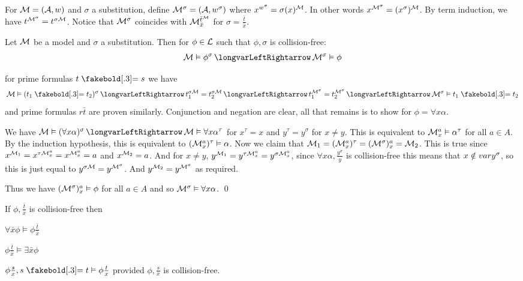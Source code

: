 \edefn

For ${\cal M}=({\cal A},w)$ and $\sigma$ a substitution, define ${\cal M}^\sigma=({\cal A},w^\sigma)$ where $x^{w^\sigma}=\sigma(x)^{{\cal M}}$.
In other words $x^{{\cal M}^\sigma}=(x^\sigma)^{{\cal M}}$.
By term induction, we have $t^{{\cal M}^\sigma}=t^{\sigma{\cal M}}$.
Notice that ${\cal M}^\sigma$ coincides with ${\cal M}^{\bar t^{{\cal M}}}_{\bar x}$ for $\sigma=\frac{\bar t}{\bar x}$.

\blemm[title=The Substitution Lemma]

    Let ${\cal M}$ be a model and $\sigma$ a substitution.
    Then for $\phi\in{\cal L}$ such that $\phi,\sigma$ is collision-free:
    $$ \c M\vDash\phi^\sigma\iff\c M^\sigma\vDash\phi $$

\elemm

\Proof for prime formulas $t\eq s$ we have
$$ \c M\vDash(t_1\eq t_2)^\sigma \iff t_1^{\sigma\c M}=t_2^{\sigma\c M} \iff t_1^{\c M^\sigma} = t_2^{\c M^\sigma} \iff \c M^\sigma\vDash t_1\eq t_2 $$
and prime formulas $r\bar t$ are proven similarly.
Conjunction and negation are clear, all that remains is to show for $\phi=\forall x\alpha$.

We have $\c M\vDash(\forall x\alpha)^\sigma\iff\c M\vDash\forall x\alpha^\tau$ for $x^\tau=x$ and $y^\tau=y^\sigma$ for $x\neq y$.
This is equivalent to ${\cal M}^a_x\vDash\alpha^\tau$ for all $a\in A$.
By the induction hypothesis, this is equivalent to $({\cal M}^a_x)^\tau\vDash\alpha$.
Now we claim that ${\cal M}_1=({\cal M}^a_x)^\tau=({\cal M}^\sigma)^a_x={\cal M}_2$.
This is true since $x^{{\cal M}_1}=x^{\tau{\cal M}^a_x}=x^{{\cal M}^a_x}=a$ and $x^{{\cal M}_2}=a$.
And for $x\neq y$, $y^{{\cal M}_1}=y^{\tau{\cal M}^a_x}=y^{\sigma{\cal M}^a_x}$, since $\forall x\alpha,\frac{y^\sigma}y$ is collision-free this means that $x\notin{\sl var} y^\sigma$, so this is just equal to
$y^{\sigma{\cal M}}=y^{{\cal M}^\sigma}$.
And $y^{{\cal M}_2}=y^{{\cal M}^\sigma}$ as required.

Thus we have $({\cal M}^\sigma)^a_x\vDash\phi$ for all $a\in A$ and so ${\cal M}^\sigma\vDash\forall x\alpha$.
\qed

\bcoro

    If $\phi,\frac{\bar t}{\bar x}$ is collision-free then
    \benum
        \item $\forall\bar x\phi\vDash\phi\frac{\bar t}{\bar x}$
        \item $\phi\frac{\bar t}{\bar x}\vDash\exists\bar x\phi$
        \item $\phi\frac sx,s\eq t\vDash\phi\frac tx$ provided $\phi,\frac sx$ is collision-free.
    \eenum

\ecoro

